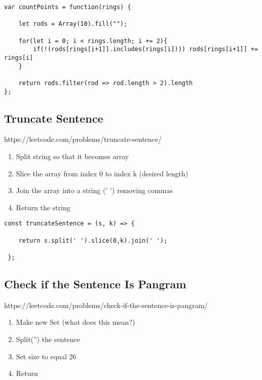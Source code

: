 \documentclass[10pt]{article}
\begin{document}
\begin{lstlisting}[title=Solution countPoints is this slower?, captionpos=t]
var countPoints = function(rings) {

    let rods = Array(10).fill("");

    for(let i = 0; i < rings.length; i += 2){
        if(!(rods[rings[i+1]].includes(rings[i]))) rods[rings[i+1]] += rings[i]
    }
    
    return rods.filter(rod => rod.length > 2).length
};
\end{lstlisting}
\medskip %



\pagebreak %
\medskip 
\subsection{Truncate Sentence}
https://leetcode.com/problems/truncate-sentence/

\begin{enumerate}
	\item Split string so that it becomes array
	\item Slice the array from index 0 to index k (desired length)
	\item Join the array into a string (' ') removing commas
	\item Return the string
\end{enumerate}

\begin{lstlisting}[title=Solution truncateSentence, captionpos=t]
const truncateSentence = (s, k) => {

    return s.split(' ').slice(0,k).join(' ');
    
 };
\end{lstlisting}
\medskip %




\pagebreak %
\medskip 
\subsection{Check if the Sentence Is Pangram}
https://leetcode.com/problems/check-if-the-sentence-is-pangram/

\begin{enumerate}
	\item Make new Set (what does this mean?)
	\item Split('') the sentence
	\item Set size to equal 26
	\item Return
\end{enumerate}
\end{document}
